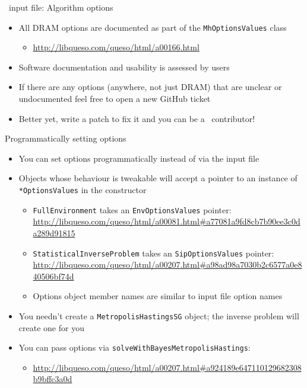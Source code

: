 \begin{frame}[fragile]{\Queso\ input file: Algorithm options}
  \begin{itemize}
    \item All DRAM options are documented as part of the
      \texttt{MhOptionsValues} class
      \begin{itemize}
        \item \url{http://libqueso.com/queso/html/a00166.html}
      \end{itemize}
    \item Software documentation and usability is assessed by users
    \item If there are any options (anywhere, not just DRAM) that are unclear
      or undocumented feel free to open a new GitHub ticket
    \item Better yet, write a patch to fix it and you can be a \Queso\
      contributor!
  \end{itemize}
\end{frame}

\begin{frame}[fragile]{Programmatically setting options}
  \begin{itemize}
    \item You can set options programmatically instead of via the input file
    \item Objects whose behaviour is tweakable will accept a pointer to an
      instance of \texttt{*OptionsValues} in the constructor
      \begin{itemize}
        \item \texttt{FullEnvironment} takes an \texttt{EnvOptionsValues}
          pointer: \url{http://libqueso.com/queso/html/a00081.html#a77081a9fd8cb7b90ee3c0da289d91815}
        \item \texttt{StatisticalInverseProblem} takes an
          \texttt{SipOptionsValues} pointer: \url{http://libqueso.com/queso/html/a00207.html#a98ad98a7030b2c6577a0e840506bf74d}
        \item Options object member names are similar to input file option names
      \end{itemize}
    \item You needn't create a \texttt{MetropolisHastingsSG} object; the
      inverse problem will create one for you
    \item You can pass options via \texttt{solveWithBayesMetropolisHastings}:
      \begin{itemize}
        \item \url{http://libqueso.com/queso/html/a00207.html#a924189e647110129682308b9bffc3a0d}
      \end{itemize}
  \end{itemize}
\end{frame}

